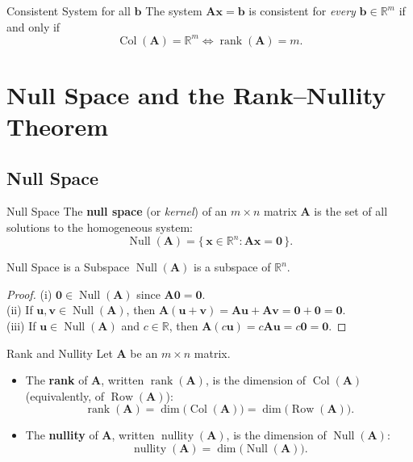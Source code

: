 \documentclass[12pt,a4paper]{article}
\newcommand{\R}{\mathbb{R}}
\newcommand{\vv}[1]{\mathbf{#1}}
\newcommand{\vzero}{\mathbf{0}}
\newcommand{\rank}{\operatorname{rank}}
\newcommand{\nullity}{\operatorname{nullity}}
\newcommand{\Null}{\operatorname{Null}}
\newcommand{\Col}{\operatorname{Col}}
\newcommand{\Row}{\operatorname{Row}}
\newcommand{\mat}[1]{\mathbf{#1}}
\begin{document}
	\begin{corbox}{Consistent System for all \(\vv{b}\)}{}
		The system \(\mat{A}\vv{x} = \vv{b}\) is consistent for \emph{every}
		\(\vv{b} \in \R^m\) if and only if
		\[
		\Col(\mat{A}) = \R^m \iff \rank(\mat{A}) = m.
		\]
	\end{corbox}
	
	\section{Null Space and the Rank--Nullity Theorem}
	
	\subsection{Null Space}
	
	\begin{defbox}{Null Space}{}
		The \textbf{null space} (or \emph{kernel}) of an \(m \times n\) matrix \(\mat{A}\)
		is the set of all solutions to the homogeneous system:
		\[
		\Null(\mat{A}) = \{\,\vv{x} \in \R^n : \mat{A}\vv{x} = \vzero\,\}.
		\]
	\end{defbox}
	
	\begin{propbox}{Null Space is a Subspace}{}
		\(\Null(\mat{A})\) is a subspace of \(\R^n\).
	\end{propbox}
	
	\begin{proof}
		(i) \(\vzero \in \Null(\mat{A})\) since \(\mat{A}\vzero = \vzero\). \\
		(ii) If \(\vv{u}, \vv{v} \in \Null(\mat{A})\), then \(\mat{A}(\vv{u}+\vv{v}) = \mat{A}\vv{u} + \mat{A}\vv{v} = \vzero + \vzero = \vzero\). \\
		(iii) If \(\vv{u} \in \Null(\mat{A})\) and \(c \in \R\), then \(\mat{A}(c\vv{u}) = c\mat{A}\vv{u} = c\vzero = \vzero\).
	\end{proof}
	
	\begin{defbox}{Rank and Nullity}{}
		Let \(\mat{A}\) be an \(m \times n\) matrix.
		\begin{itemize}[leftmargin=1.5em, itemsep=2pt]
			\item The \textbf{rank} of \(\mat{A}\), written \(\rank(\mat{A})\), is the dimension of
			\(\Col(\mat{A})\) (equivalently, of \(\Row(\mat{A})\)):
			\[
			\rank(\mat{A}) = \dim\bigl(\Col(\mat{A})\bigr) = \dim\bigl(\Row(\mat{A})\bigr).
			\]
			\item The \textbf{nullity} of \(\mat{A}\), written \(\nullity(\mat{A})\), is the dimension of
			\(\Null(\mat{A})\):
			\[
			\nullity(\mat{A}) = \dim\bigl(\Null(\mat{A})\bigr).
			\]
		\end{itemize}
	\end{defbox}
	
\end{document}
